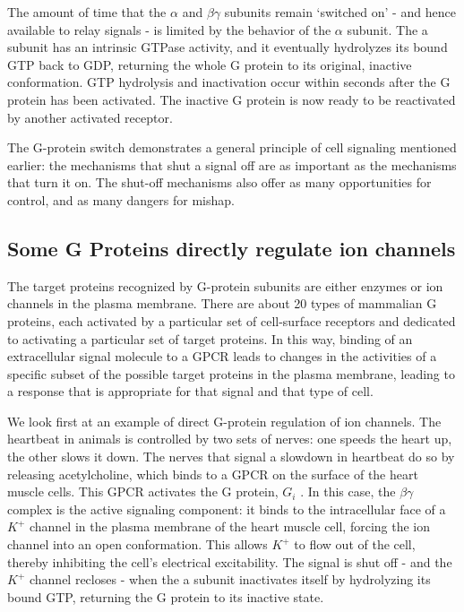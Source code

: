 The amount of time that the $\alpha$ and $\beta\gamma$ subunits remain `switched on' -
and hence available to relay signals - is limited by the behavior of the $\alpha$
subunit. The a subunit has an intrinsic GTPase activity, and it eventually
hydrolyzes its bound GTP back to GDP, returning the whole G protein 
to its original, inactive conformation. GTP hydrolysis and
inactivation occur within seconds after the G protein has been activated.
The inactive G protein is now ready to be reactivated by another activated receptor.

The G-protein switch demonstrates a general principle of cell signaling
mentioned earlier: the mechanisms that shut a signal off are as important 
as the mechanisms that turn it on. The shut-off
mechanisms also offer as many opportunities for control, and as many
dangers for mishap.

\subsection{Some G Proteins directly regulate ion channels}

The target proteins recognized by G-protein subunits are either enzymes
or ion channels in the plasma membrane. There are about 20 types of
mammalian G proteins, each activated by a particular set of cell-surface
receptors and dedicated to activating a particular set of target proteins.
In this way, binding of an extracellular signal molecule to a GPCR leads to
changes in the activities of a specific subset of the possible target proteins
in the plasma membrane, leading to a response that is appropriate for
that signal and that type of cell.

We look first at an example of direct G-protein regulation of ion channels.
The heartbeat in animals is controlled by two sets of nerves: one speeds
the heart up, the other slows it down. The nerves that signal a slowdown
in heartbeat do so by releasing acetylcholine, which binds to a GPCR on
the surface of the heart muscle cells. This GPCR activates the G protein,
$G_i$ . In this case, the $\beta\gamma$ complex is the active signaling component: it binds
to the intracellular face of a $K^+$ channel in the plasma membrane of the
heart muscle cell, forcing the ion channel into an open conformation. 
This allows $K^+$ to flow out of the cell, thereby inhibiting
the cell’s electrical excitability. The signal is shut off -
and the $K^+$ channel recloses - when the a subunit inactivates itself by
hydrolyzing its bound GTP, returning the G protein to its inactive state.


